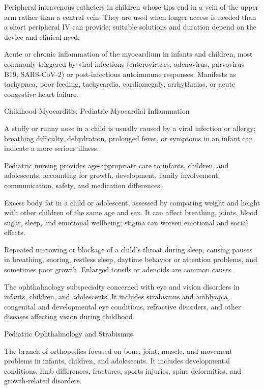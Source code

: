  Peripheral intravenous catheters in children whose tips end in a vein of the upper arm rather than a central vein. They are used when longer access is needed than a short peripheral IV can provide; suitable solutions and duration depend on the device and clinical need.


 Acute or chronic inflammation of the myocardium in infants and children, most commonly triggered by viral infections (enteroviruses, adenovirus, parvovirus B19, SARS-CoV-2) or post-infectious autoimmune responses. Manifests as tachypnea, poor feeding, tachycardia, cardiomegaly, arrhythmias, or acute congestive heart failure.

\synonyms
Childhood Myocarditis; Pediatric Myocardial Inflammation

 A stuffy or runny nose in a child is usually caused by a viral infection or allergy; breathing difficulty, dehydration, prolonged fever, or symptoms in an infant can indicate a more serious illness.

 Pediatric nursing provides age-appropriate care to infants, children, and adolescents, accounting for growth, development, family involvement, communication, safety, and medication differences.

 Excess body fat in a child or adolescent, assessed by comparing weight and height with other children of the same age and sex. It can affect breathing, joints, blood sugar, sleep, and emotional wellbeing; stigma can worsen emotional and social effects.

 Repeated narrowing or blockage of a child’s throat during sleep, causing pauses in breathing, snoring, restless sleep, daytime behavior or attention problems, and sometimes poor growth. Enlarged tonsils or adenoids are common causes.

 The ophthalmology subspecialty concerned with eye and vision disorders in
infants, children, and adolescents. It includes strabismus and amblyopia, congenital and
developmental eye conditions, refractive disorders, and other diseases affecting vision
during childhood.

\synonyms
Pediatric Ophthalmology and Strabismus

 The branch of orthopedics focused on bone, joint, muscle, and movement problems in infants, children, and adolescents. It includes developmental conditions, limb differences, fractures, sports injuries, spine deformities, and growth-related disorders.

